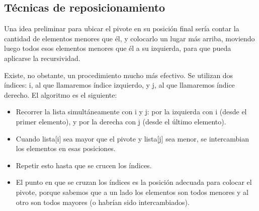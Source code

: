 \documentclass[8pt, A4]{article}    %
\begin{document}
\subsection{Técnicas de reposicionamiento}
Una idea preliminar para ubicar el pivote en su posición final sería contar la cantidad de elementos menores que él, y colocarlo un lugar más arriba, moviendo luego todos esos elementos menores que él a su izquierda, para que pueda aplicarse la recursividad.

Existe, no obstante, un procedimiento mucho más efectivo. Se utilizan dos índices: i, al que llamaremos índice izquierdo, y j, al que llamaremos índice derecho. El algoritmo es el siguiente:
\begin{itemize}
    \item Recorrer la lista simultáneamente con i y j: por la izquierda con i (desde el primer elemento), y por la derecha con j (desde el último elemento).
    \item Cuando lista[i] sea mayor que el pivote y lista[j] sea menor, se intercambian los elementos en esas posiciones.
    \item Repetir esto hasta que se crucen los índices.
    \item El punto en que se cruzan los índices es la posición adecuada para colocar el pivote, porque sabemos que a un lado los elementos son todos menores y al otro son todos mayores (o habrían sido intercambiados).
\end{itemize}
\end{document}
